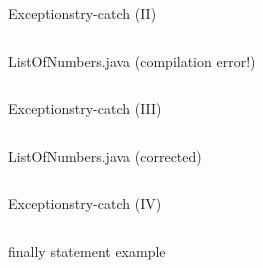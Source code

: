 \documentclass[10pt,compress]{beamer} %
\begin{document}
\begin{frame}[plain]{Exceptions}{try-catch (II)}
	\vspace{-0.2cm}
    \begin{columns}
 	   \column{\textwidth}
	\begin{block}{ListOfNumbers.java (compilation error!)}
	\vspace{-0.2cm}
		
	\vspace{-0.2cm}
	\end{block}
	\end{columns}
\end{frame}

\begin{frame}[plain]{Exceptions}{try-catch (III)}
    \begin{columns}
 	   \column{\textwidth}
	\begin{block}{ListOfNumbers.java (corrected)}
	\vspace{-0.2cm}
		
	\vspace{-0.2cm}
	\end{block}
	\end{columns}
\end{frame}

\begin{frame}[plain]{Exceptions}{try-catch (IV)}
	\vspace{-0.2cm}
    \begin{columns}
 	   \column{\textwidth}
	\begin{block}{finally statement example}
	\vspace{-0.2cm}
		
	\vspace{-0.2cm}
	\end{block}
	\end{columns}
\end{frame}
\end{document}
